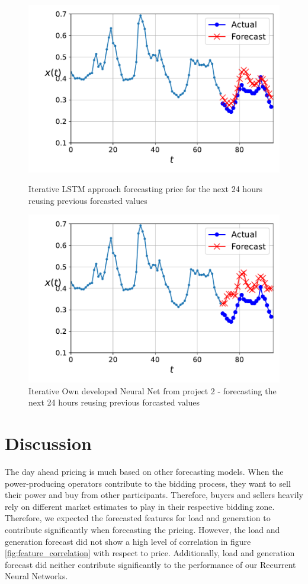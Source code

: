 \documentclass
[twocolumn,
secnumarabic,
nobibnotes,
aps,
prl,
reprint,
groupedaddress,
amsmath,
amssymb,
]{revtex4-2}
\begin{document}
\begin{figure}
  \includegraphics[width=\columnwidth]{figures/iterative_LSTM.pdf}
  \caption{\label{fig:iterative_LSTM}Iterative LSTM approach forecasting price for the next 24 hours reusing previous forcasted values}
  \includegraphics[width=\columnwidth]{figures/iterative_OWN_NN.pdf}
  \caption{\label{fig:iterative_NN}Iterative Own developed Neural Net from project 2 - forecasting the next 24 hours reusing previous forcasted values}
\end{figure}

\section{Discussion}
The day ahead pricing is much based on other forecasting models. When the power-producing operators contribute to the bidding process, they want to sell their power and buy from other participants. Therefore, buyers and sellers heavily rely on different market estimates to play in their respective bidding zone. Therefore, we expected the forecasted features for load and generation to contribute significantly when forecasting the pricing. However, the load and generation forecast did not show a high level of correlation in figure \ref{fig:feature_correlation} with respect to price. Additionally, load and generation forecast did neither contribute significantly to the performance of our Recurrent Neural Networks.
\end{document}
